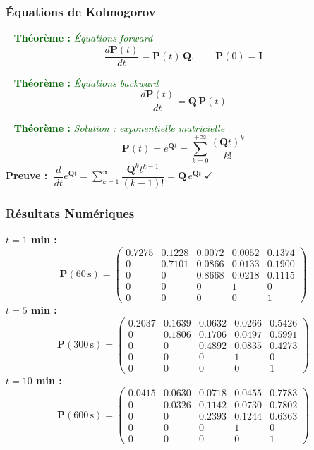 \documentclass[11pt,a4paper]{article}
\newenvironment{thmbox}[1]{%
  \vspace{3pt}\begin{framed}
  \noindent{\color{DarkGreen}\rule{0.3cm}{3pt}}~%
  \textcolor{DarkGreen}{\textbf{Théorème :} \textit{#1}}\\[3pt]}
  {\end{framed}\vspace{3pt}}
\newcommand{\mat}[1]{\mathbf{#1}}
\begin{document}
\subsubsection{Équations de Kolmogorov}

\begin{thmbox}{Équations forward}
\[
\boxed{\frac{d\mat{P}(t)}{dt} = \mat{P}(t)\,\mat{Q}}, \qquad \mat{P}(0) = \mat{I}
\]
\end{thmbox}

\begin{thmbox}{Équations backward}
\[
\boxed{\frac{d\mat{P}(t)}{dt} = \mat{Q}\,\mat{P}(t)}
\]
\end{thmbox}

\begin{thmbox}{Solution : exponentielle matricielle}
\[
\boxed{\mat{P}(t) = e^{\mat{Q}t} = \sum_{k=0}^{+\infty} \frac{(\mat{Q}t)^k}{k!}}
\]
\textbf{Preuve :} $\;\dfrac{d}{dt}e^{\mat{Q}t}
= \sum_{k=1}^{\infty}\dfrac{\mat{Q}^k t^{k-1}}{(k-1)!}
= \mat{Q}\,e^{\mat{Q}t} \;\checkmark$
\end{thmbox}

\subsubsection{Résultats Numériques}

\textbf{$t = 1$ min :}
\[
\mat{P}(60\,\text{s}) = \begin{pmatrix}
0.7275 & 0.1228 & 0.0072 & 0.0052 & 0.1374 \\
0 & 0.7101 & 0.0866 & 0.0133 & 0.1900 \\
0 & 0 & 0.8668 & 0.0218 & 0.1115 \\
0 & 0 & 0 & 1 & 0 \\ 0 & 0 & 0 & 0 & 1
\end{pmatrix}
\]
\textbf{$t = 5$ min :}
\[
\mat{P}(300\,\text{s}) = \begin{pmatrix}
0.2037 & 0.1639 & 0.0632 & 0.0266 & 0.5426 \\
0 & 0.1806 & 0.1706 & 0.0497 & 0.5991 \\
0 & 0 & 0.4892 & 0.0835 & 0.4273 \\
0 & 0 & 0 & 1 & 0 \\ 0 & 0 & 0 & 0 & 1
\end{pmatrix}
\]
\textbf{$t = 10$ min :}
\[
\mat{P}(600\,\text{s}) = \begin{pmatrix}
0.0415 & 0.0630 & 0.0718 & 0.0455 & 0.7783 \\
0 & 0.0326 & 0.1142 & 0.0730 & 0.7802 \\
0 & 0 & 0.2393 & 0.1244 & 0.6363 \\
0 & 0 & 0 & 1 & 0 \\ 0 & 0 & 0 & 0 & 1
\end{pmatrix}
\]
\end{document}
